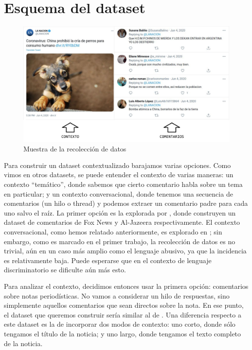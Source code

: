 \section{Esquema del dataset}



\begin{figure}[t]
    \centering
    \includegraphics[width=\textwidth]{img/idea_dataset.pdf}
    \caption{Muestra de la recolección de datos}
    \label{fig:idea_dataset}
\end{figure}

Para construir un dataset contextualizado barajamos varias opciones. Como vimos en otros datasets, se puede entender el contexto de varias maneras: un contexto ``temático'', donde sabemos que cierto comentario habla sobre un tema en particular; y un contexto conversacional, donde tenemos una secuencia de comentarios (un hilo o thread) y podemos extraer un comentario padre para cada uno salvo el raíz. La primer opción es la explorada por \citet{gao-huang-2017-detecting,mubarak-etal-2017-abusive}, donde construyen un dataset de comentarios de Fox News y Al-Jazeera respectivamente. El contexto conversacional, como hemos relatado anteriormente, es explorado en \citet{pavlopoulos2020toxicity,xenos-2021-context}; sin embargo, como es marcado en el primer trabajo, la recolección de datos es no trivial, aún en un caso más amplio como el lenguaje abusivo, ya que la incidencia es relativamente baja. Puede esperarse que en el contexto de lenguaje discriminatorio se dificulte aún más esto.

Para analizar el contexto, decidimos entonces usar la primera opción: comentarios sobre notas periodísticas. No vamos a considerar un hilo de respuestas, sino simplemente aquellos comentarios que sean directos sobre la nota. En ese punto, el dataset que queremos construir sería similar al de \cite{gao-huang-2017-detecting}. Una diferencia respecto a este dataset es la de incorporar dos modos de contexto: uno corto, donde sólo tengamos el título de la noticia; y uno largo, donde tengamos el texto completo de la noticia.

